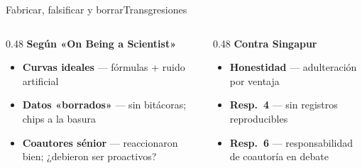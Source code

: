 \documentclass[11pt,aspectratio=169,xcolor=table]{beamer}
\newcommand{\iconitem}[4][usachrojo]{%
  \item[\textcolor{#1}{#2}] \textbf{#3} — #4}
\begin{document}
\begin{frame}{Fabricar, falsificar y borrar}{Transgresiones}
  \begin{columns}[T,onlytextwidth]
    \begin{column}{0.48\textwidth}
      \textbf{Según «On Being a Scientist»}
      \begin{itemize}\usachaire
        \iconitem[usachrojo]{\faLineChart}{Curvas ideales}{fórmulas + ruido artificial}
        \iconitem[usachrojo]{\faTrashO}{Datos «borrados»}{sin bitácoras; chips a la basura}
        \iconitem[usachgris70]{\faUsers}{Coautores sénior}{reaccionaron bien; ¿debieron ser proactivos?}
      \end{itemize}
    \end{column}
    \begin{column}{0.48\textwidth}
      \textbf{Contra Singapur}
      \begin{itemize}\usachaire
        \iconitem[usachnaranjo]{\faBan}{Honestidad}{adulteración por ventaja}
        \iconitem[usachnaranjo]{\faDatabase}{Resp.~4}{sin registros reproducibles}
        \iconitem[usachgris70]{\faUsers}{Resp.~6}{responsabilidad de coautoría en debate}
      \end{itemize}
    \end{column}
  \end{columns}
\end{frame}
\end{document}

